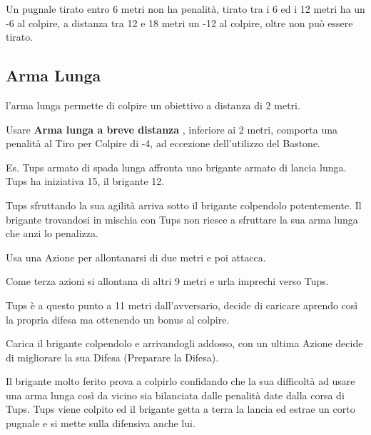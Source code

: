 \begin{multicols}{2}
Un pugnale tirato entro 6 metri non ha penalità, tirato tra i 6 ed i 12 metri ha un -6 al colpire, a distanza tra 12 e 18 metri un -12 al colpire, oltre non può essere tirato.

%
\subsection{Arma Lunga} \label{armalunga}

l'arma lunga permette di colpire un obiettivo a distanza di 2 metri.

Usare \textbf{Arma lunga a breve distanza} \label{armalungabrevedistanza}, inferiore ai 2 metri, comporta una penalità al Tiro per Colpire di -4, ad eccezione dell'utilizzo del Bastone.

\begin{changemargin}{0.3cm}{0.3cm}\begin{tcolorbox}[title = Combattimento con Arma Lunga]
		Es. Tups armato di spada lunga affronta uno brigante armato di lancia lunga. Tups ha iniziativa 15, il brigante 12.

		Tups sfruttando la sua agilità arriva sotto il brigante colpendolo potentemente. Il brigante trovandosi in mischia con Tups non riesce a sfruttare la sua arma lunga che anzi lo penalizza.

		Usa una Azione per allontanarsi di due metri e poi attacca.

		Come terza azioni si allontana di altri 9 metri e urla imprechi verso Tups.

		Tups è a questo punto a 11 metri dall'avversario, decide di caricare aprendo così la propria difesa ma ottenendo un bonus al colpire.

		Carica il brigante colpendolo e arrivandogli addosso, con un ultima Azione decide di migliorare la sua Difesa (Preparare la Difesa).

		Il brigante molto ferito prova a colpirlo confidando che la sua difficoltà ad usare una arma lunga così da vicino sia bilanciata dalle penalità date dalla corsa di Tups. Tups viene colpito ed il brigante getta a terra la lancia ed estrae un corto pugnale e si mette sulla difensiva anche lui.

\end{tcolorbox}\end{changemargin}


\end{multicols}
